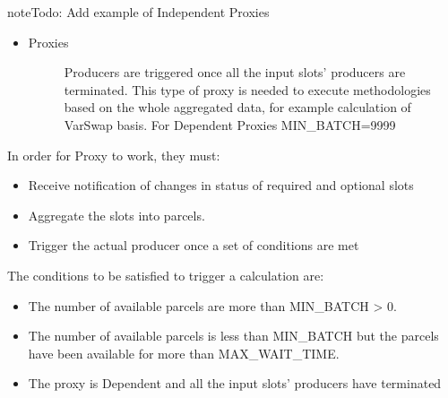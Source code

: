 \documentclass[letterpaper,10pt,english]{sphinxmanual}
\begin{document}
\begin{sphinxadmonition}{note}{\label{slot_prod:index-1}Todo:}
Add example of Independent Proxies
\end{sphinxadmonition}
\begin{itemize}
\item {} \begin{description}
\item[{ Proxies}] \leavevmode
Producers are triggered once all the input slots’ producers are terminated.
This type of proxy is needed to execute methodologies based on the whole
aggregated data, for example calculation of VarSwap basis. For Dependent
Proxies MIN\_BATCH=9999

\end{description}

\end{itemize}

In order for Proxy to work, they must:
\begin{itemize}
\item {} 
Receive notification of changes in status of required and optional slots

\item {} 
Aggregate the slots into parcels.

\item {} 
Trigger the actual producer once a set of conditions are met

\end{itemize}

The conditions to be satisfied to trigger a calculation are:
\begin{itemize}
\item {} 
The number of available parcels are more than MIN\_BATCH \textgreater{} 0.

\item {} 
The number of available parcels is less than MIN\_BATCH but the parcels have been
available for more than MAX\_WAIT\_TIME.

\item {} 
The proxy is Dependent and all the input slots’ producers have terminated

\end{itemize}
\end{document}
